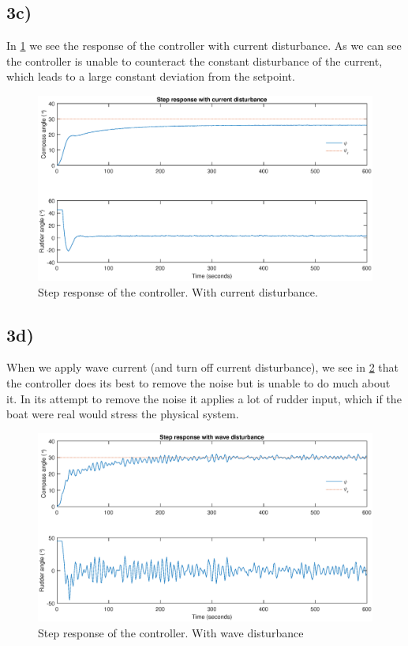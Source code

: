 \subsection{3c)}

In \cref{fig:step_current_dist} we see the response of the controller with current disturbance. As we can see the controller is unable to counteract the constant disturbance of the current, which leads to a large constant deviation from the setpoint.

\begin{figure}
    \centering
    \includegraphics[width=\textwidth]{images/oppg3/stepresp_current_disturbance.eps}
    \caption{Step response of the controller. With current disturbance.}
    \label{fig:step_current_dist}
\end{figure}

\subsection{3d)}

When we apply wave current (and turn off current disturbance), we see in \cref{fig:step_wave_dist} that the controller does its best to remove the noise but is unable to do much about it. In its attempt to remove the noise it applies a lot of rudder input, which if the boat were real would stress the physical system.

\begin{figure}
    \centering
    \includegraphics[width=\textwidth]{images/oppg3/stepresp_wave_disturbance.eps}
    \caption{Step response of the controller. With wave disturbance}
    \label{fig:step_wave_dist}
\end{figure}

